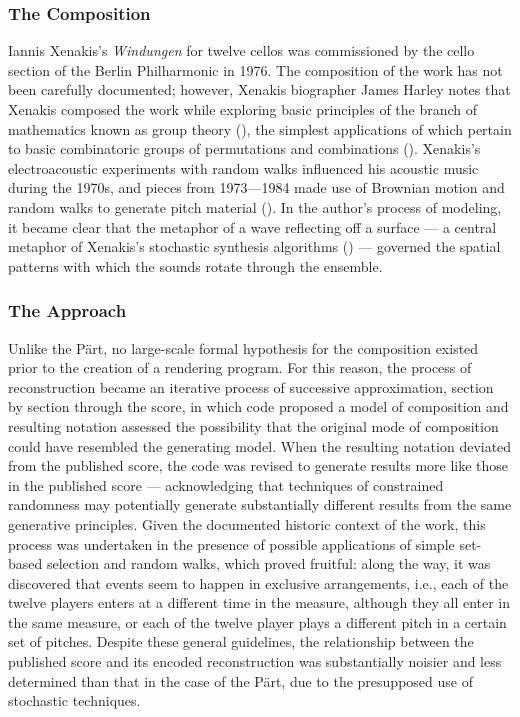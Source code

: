\subsubsection{The Composition}
Iannis Xenakis's \emph{Windungen} for twelve cellos was commissioned by the cello section of the Berlin Philharmonic in 1976. The composition of the work has not been carefully documented; however, Xenakis biographer James Harley notes that Xenakis composed the work while exploring basic principles of the branch of mathematics known as group theory (\cite[90]{harley2004xenakis}), the simplest applications of which pertain to basic combinatoric groups of permutations and combinations (\cite{magnus2004combinatorial}). Xenakis's electroacoustic experiments with random walks influenced his acoustic music during the 1970s, and pieces from 1973---1984 made use of Brownian motion and random walks to generate pitch material (\cite{solomos2001unity}). In the author's process of modeling, it became clear that the metaphor of a wave reflecting off a surface --- a central metaphor of Xenakis's stochastic synthesis algorithms (\cite{Luque2009}) --- governed the spatial patterns with which the sounds rotate through the ensemble.
\subsubsection{The Approach}
Unlike the P\"{a}rt, no large-scale formal hypothesis for the composition existed prior to the creation of a rendering program. For this reason, the process of reconstruction became an iterative process of successive approximation, section by section through the score, in which code proposed a model of composition and resulting notation assessed the possibility that the original mode of composition could have resembled the generating model. When the resulting notation deviated from the published score, the code was revised to generate results more like those in the published score --- acknowledging that techniques of constrained randomness may potentially generate substantially different results from the same generative principles. Given the documented historic context of the work, this process was undertaken in the presence of possible applications of simple set-based selection and random walks, which proved fruitful: along the way, it was discovered that events seem to happen in exclusive arrangements, i.e., each of the twelve players enters at a different time in the measure, although they all enter in the same measure, or each of the twelve player plays a different pitch in a certain set of pitches. Despite these general guidelines, the relationship between the published score and its encoded reconstruction was substantially noisier and less determined than that in the case of the P\"{a}rt, due to the presupposed use of stochastic techniques.
